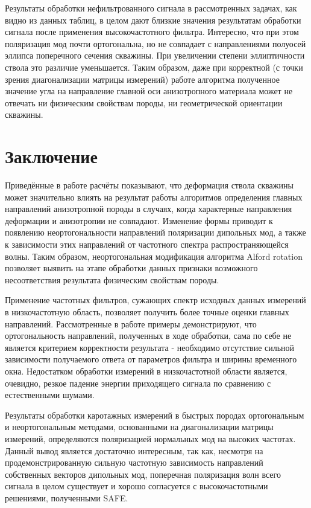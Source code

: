 \documentclass[a4paper,11pt]{article}
\begin{document}
Результаты обработки нефильтрованного сигнала в рассмотренных задачах, как видно из данных таблиц, в целом дают близкие значения результатам обработки сигнала после применения высокочастотного фильтра. Интересно, что при этом поляризация мод почти ортогональна, но не совпадает с направлениями полуосей эллипса поперечного сечения скважины. При увеличении степени эллиптичности ствола это различие уменьшается. Таким образом, даже при корректной (с точки зрения диагонализации матрицы измерений) работе алгоритма полученное значение угла на направление главной оси анизотропного материала может не отвечать ни физическим свойствам породы, ни геометрической ориентации скважины. 


\section{Заключение}
Приведённые в работе расчёты показывают, что деформация ствола скважины может значительно влиять на результат работы алгоритмов определения главных направлений анизотропной породы в случаях, когда характерные направления деформации и анизотропии не совпадают. Изменение формы приводит к появлению неортогональности направлений поляризации дипольных мод, а также к зависимости этих направлений от частотного спектра распространяющейся волны. Таким образом, неортогональная модификация алгоритма Alford rotation позволяет выявить на этапе обработки данных признаки возможного несоответствия результата физическим свойствам породы.  

Применение частотных фильтров, сужающих спектр исходных данных измерений в низкочастотную область, позволяет получить более точные оценки главных направлений. Рассмотренные в работе примеры демонстрируют, что ортогональность направлений, полученных в ходе обработки, сама по себе не является критерием корректности результата - необходимо отсутствие сильной зависимости получаемого ответа от параметров фильтра и ширины временного окна. Недостатком обработки измерений в низкочастотной области является, очевидно, резкое падение энергии приходящего сигнала по сравнению с естественными шумами.

Результаты обработки каротажных измерений в быстрых породах ортогональным и неортогональным методами, основанными на диагонализации матрицы измерений, определяются поляризацией нормальных мод на высоких частотах. Данный вывод является достаточно интересным, так как, несмотря на продемонстрированную сильную частотную зависимость направлений собственных векторов дипольных мод, поперечная поляризация волн всего сигнала в целом существует и хорошо согласуется с высокочастотными решениями, полученными SAFE. 
\end{document}
